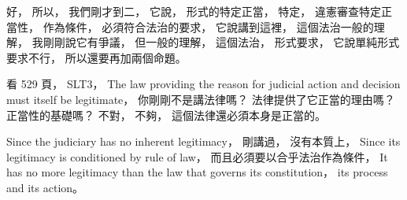 \hypertarget{w02:cue:1533}{}好，
\hypertarget{w02:cue:1534}{}所以，
\hypertarget{w02:cue:1535}{}我們剛才到二，
\hypertarget{w02:cue:1536}{}它說，
\hypertarget{w02:cue:1537}{}形式的特定正當，
\hypertarget{w02:cue:1538}{}特定，
\hypertarget{w02:cue:1539}{}違憲審查特定正當性，
\hypertarget{w02:cue:1540}{}作為條件，
\hypertarget{w02:cue:1541}{}必須符合法治的要求，
\hypertarget{w02:cue:1542}{}它說講到這裡，
\hypertarget{w02:cue:1543}{}這個法治一般的理解，
\hypertarget{w02:cue:1544}{}我剛剛說它有爭議，
\hypertarget{w02:cue:1545}{}但一般的理解，
\hypertarget{w02:cue:1546}{}這個法治，
\hypertarget{w02:cue:1547}{}形式要求，
\hypertarget{w02:cue:1548}{}它說單純形式要求不行，
\hypertarget{w02:cue:1549}{}所以還要再加兩個命題。

\hypertarget{w02:cue:1550}{}看 529 頁，
\hypertarget{w02:cue:1551}{}SLT3，
\hypertarget{w02:cue:1552}{}The law providing the reason for judicial action and decision must itself be legitimate，
\hypertarget{w02:cue:1553}{}你剛剛不是講法律嗎？
\hypertarget{w02:cue:1554}{}法律提供了它正當的理由嗎？
\hypertarget{w02:cue:1555}{}正當性的基礎嗎？
\hypertarget{w02:cue:1556}{}不對，
\hypertarget{w02:cue:1557}{}不夠，
\hypertarget{w02:cue:1558}{}這個法律還必須本身是正當的。

\hypertarget{w02:cue:1559}{}Since the judiciary has no inherent legitimacy，
\hypertarget{w02:cue:1560}{}剛講過，
\hypertarget{w02:cue:1561}{}沒有本質上，
\hypertarget{w02:cue:1562}{}Since its legitimacy is conditioned by rule of law，
\hypertarget{w02:cue:1563}{}而且必須要以合乎法治作為條件，
\hypertarget{w02:cue:1564}{}It has no more legitimacy than the law that governs its constitution，
\hypertarget{w02:cue:1565}{}its process and its action。

